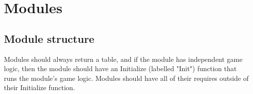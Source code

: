 \chapter{Modules}
\section{Module structure}
Modules should always return a table, and if the module has independent game logic, then the module should have an Initialize (labelled "Init") function that runs the module's game logic.
Modules should have all of their requires outside of their Initialize function.